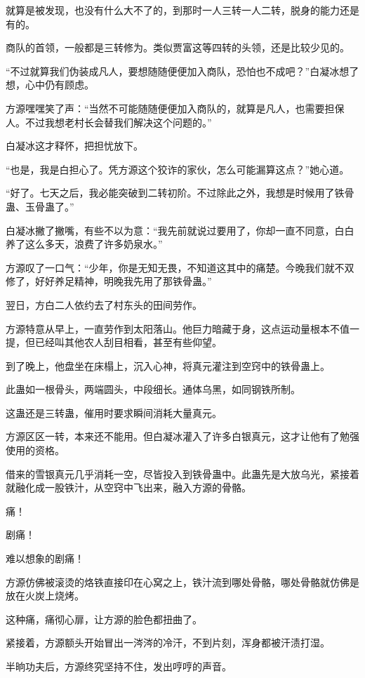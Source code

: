 \begin{this_body}
就算是被发现，也没有什么大不了的，到那时一人三转一人二转，脱身的能力还是有的。

商队的首领，一般都是三转修为。类似贾富这等四转的头领，还是比较少见的。

“不过就算我们伪装成凡人，要想随随便便加入商队，恐怕也不成吧？”白凝冰想了想，心中仍有顾虑。

方源嘿嘿笑了声：“当然不可能随随便便加入商队的，就算是凡人，也需要担保人。不过我想老村长会替我们解决这个问题的。”

白凝冰这才释怀，把担忧放下。

“也是，我是白担心了。凭方源这个狡诈的家伙，怎么可能漏算这点？”她心道。

“好了。七天之后，我必能突破到二转初阶。不过除此之外，我想是时候用了铁骨蛊、玉骨蛊了。”

白凝冰撇了撇嘴，有些不以为意：“我先前就说过要用了，你却一直不同意，白白养了这么多天，浪费了许多奶泉水。”

方源叹了一口气：“少年，你是无知无畏，不知道这其中的痛楚。今晚我们就不双修了，好好养足精神，明晚我先用了那铁骨蛊。”

翌日，方白二人依约去了村东头的田间劳作。

方源特意从早上，一直劳作到太阳落山。他巨力暗藏于身，这点运动量根本不值一提，但已经叫其他农人刮目相看，甚至有些仰望。

到了晚上，他盘坐在床榻上，沉入心神，将真元灌注到空窍中的铁骨蛊上。

此蛊如一根骨头，两端圆头，中段细长。通体乌黑，如同钢铁所制。

这蛊还是三转蛊，催用时要求瞬间消耗大量真元。

方源区区一转，本来还不能用。但白凝冰灌入了许多白银真元，这才让他有了勉强使用的资格。

借来的雪银真元几乎消耗一空，尽皆投入到铁骨蛊中。此蛊先是大放乌光，紧接着就融化成一股铁汁，从空窍中飞出来，融入方源的骨骼。

痛！

剧痛！

难以想象的剧痛！

方源仿佛被滚烫的烙铁直接印在心窝之上，铁汁流到哪处骨骼，哪处骨骼就仿佛是放在火炭上烧烤。

这种痛，痛彻心扉，让方源的脸色都扭曲了。

紧接着，方源额头开始冒出一涔涔的冷汗，不到片刻，浑身都被汗渍打湿。

半晌功夫后，方源终究坚持不住，发出哼哼的声音。


\end{this_body}

